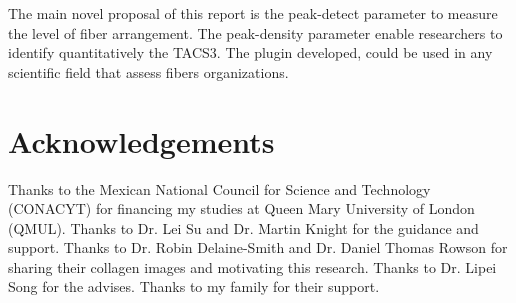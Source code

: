 \documentclass[12pt,a4paper]{article}
\begin{document}
The main novel proposal of this report is the peak-detect parameter to measure the level of fiber arrangement. The peak-density parameter enable researchers to identify quantitatively the TACS3. The plugin developed, could be used in any scientific field that assess fibers organizations.

\section{Acknowledgements}

Thanks to the Mexican National Council for Science and Technology (CONACYT) for financing my studies at Queen Mary University of London (QMUL). Thanks to Dr. Lei Su and Dr. Martin Knight for the guidance and support. Thanks to Dr. Robin Delaine-Smith and Dr. Daniel Thomas Rowson for sharing their collagen images and motivating this research. Thanks to Dr. Lipei Song for the advises. Thanks to my family for their support.      
\end{document}
